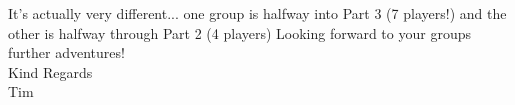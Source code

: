 It's actually very different... one group is halfway into Part 3 (7 players!) and the other is halfway through Part 2 (4 players) Looking forward to your groups further adventures!\\

Kind Regards\\

Tim\\

